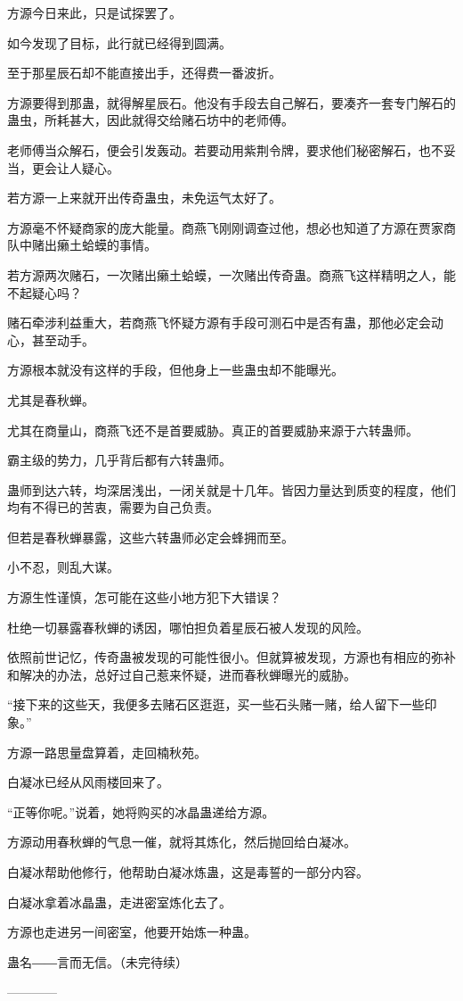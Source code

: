 \begin{this_body}
方源今日来此，只是试探罢了。

如今发现了目标，此行就已经得到圆满。

至于那星辰石却不能直接出手，还得费一番波折。

方源要得到那蛊，就得解星辰石。他没有手段去自己解石，要凑齐一套专门解石的蛊虫，所耗甚大，因此就得交给赌石坊中的老师傅。

老师傅当众解石，便会引发轰动。若要动用紫荆令牌，要求他们秘密解石，也不妥当，更会让人疑心。

若方源一上来就开出传奇蛊虫，未免运气太好了。

方源毫不怀疑商家的庞大能量。商燕飞刚刚调查过他，想必也知道了方源在贾家商队中赌出癞土蛤蟆的事情。

若方源两次赌石，一次赌出癞土蛤蟆，一次赌出传奇蛊。商燕飞这样精明之人，能不起疑心吗？

赌石牵涉利益重大，若商燕飞怀疑方源有手段可测石中是否有蛊，那他必定会动心，甚至动手。

方源根本就没有这样的手段，但他身上一些蛊虫却不能曝光。

尤其是春秋蝉。

尤其在商量山，商燕飞还不是首要威胁。真正的首要威胁来源于六转蛊师。

霸主级的势力，几乎背后都有六转蛊师。

蛊师到达六转，均深居浅出，一闭关就是十几年。皆因力量达到质变的程度，他们均有不得已的苦衷，需要为自己负责。

但若是春秋蝉暴露，这些六转蛊师必定会蜂拥而至。

小不忍，则乱大谋。

方源生性谨慎，怎可能在这些小地方犯下大错误？

杜绝一切暴露春秋蝉的诱因，哪怕担负着星辰石被人发现的风险。

依照前世记忆，传奇蛊被发现的可能性很小。但就算被发现，方源也有相应的弥补和解决的办法，总好过自己惹来怀疑，进而春秋蝉曝光的威胁。

“接下来的这些天，我便多去赌石区逛逛，买一些石头赌一赌，给人留下一些印象。”

方源一路思量盘算着，走回楠秋苑。

白凝冰已经从风雨楼回来了。

“正等你呢。”说着，她将购买的冰晶蛊递给方源。

方源动用春秋蝉的气息一催，就将其炼化，然后抛回给白凝冰。

白凝冰帮助他修行，他帮助白凝冰炼蛊，这是毒誓的一部分内容。

白凝冰拿着冰晶蛊，走进密室炼化去了。

方源也走进另一间密室，他要开始炼一种蛊。

蛊名――言而无信。（未完待续）

------------

\end{this_body}

